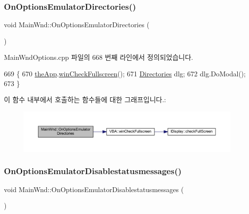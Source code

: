 \subsubsection{\texorpdfstring{On\+Options\+Emulator\+Directories()}{OnOptionsEmulatorDirectories()}}
{\footnotesize\ttfamily void Main\+Wnd\+::\+On\+Options\+Emulator\+Directories (\begin{DoxyParamCaption}{ }\end{DoxyParamCaption})\hspace{0.3cm}{\ttfamily [protected]}}



Main\+Wnd\+Options.\+cpp 파일의 668 번째 라인에서 정의되었습니다.


\begin{DoxyCode}
669 \{
670   \mbox{\hyperlink{_v_b_a_8cpp_a8095a9d06b37a7efe3723f3218ad8fb3}{theApp}}.\mbox{\hyperlink{class_v_b_a_a340eaeeb7fcfc242f08ac3442d991a96}{winCheckFullscreen}}();
671   \mbox{\hyperlink{class_directories}{Directories}} dlg;
672   dlg.DoModal();
673 \}
\end{DoxyCode}
이 함수 내부에서 호출하는 함수들에 대한 그래프입니다.\+:
\nopagebreak
\begin{figure}[H]
\begin{center}
\leavevmode
\includegraphics[width=350pt]{class_main_wnd_a5d36b0308cca73a7aa4af8df269a743c_cgraph}
\end{center}
\end{figure}
\mbox{\label{class_main_wnd_adaf6a97c2076cf3b509e5847f57c223d}} 
\subsubsection{\texorpdfstring{On\+Options\+Emulator\+Disablestatusmessages()}{OnOptionsEmulatorDisablestatusmessages()}}
{\footnotesize\ttfamily void Main\+Wnd\+::\+On\+Options\+Emulator\+Disablestatusmessages (\begin{DoxyParamCaption}{ }\end{DoxyParamCaption})\hspace{0.3cm}{\ttfamily [protected]}}



